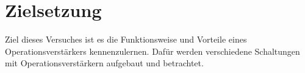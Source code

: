\section{Zielsetzung}
\label{sec:Zielsetzung}

        Ziel dieses Versuches ist es die Funktionsweise und Vorteile eines Operationsverstärkers kennenzulernen.
        Dafür werden verschiedene Schaltungen mit Operationsverstärkern aufgebaut und betrachtet.
